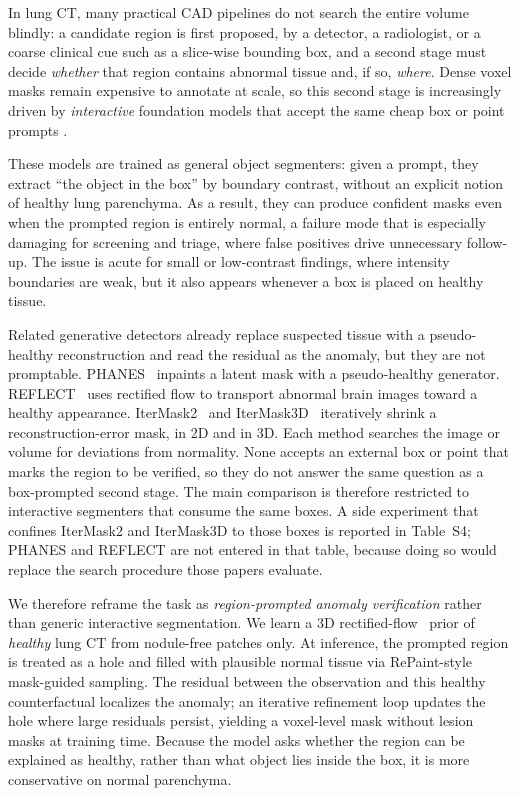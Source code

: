 \documentclass[twoside]{article}
\newcommand{\suppTabUnprompted}{Table~S4}
\begin{document}
In lung CT, many practical CAD pipelines do not search the entire
volume blindly: a candidate region is first proposed, by a
detector, a radiologist, or a coarse clinical cue such as a
slice-wise bounding box, and a second stage must decide
\emph{whether} that region contains abnormal tissue and, if so,
\emph{where}. Dense voxel masks remain expensive to annotate at
scale, so this second stage is increasingly driven by
\emph{interactive} foundation models that accept the same cheap
box or point prompts
\citep{nninteractive2025,segvol2024,sam_med3d2023,medsam2_2025,vista3d2024}.

These models are trained as general object segmenters: given a prompt,
they extract ``the object in the box'' by boundary contrast, without an
explicit notion of healthy lung parenchyma. As a result, they can produce
confident masks even when the prompted region is entirely
normal, a failure mode that is especially damaging for screening and
triage, where false positives drive unnecessary follow-up. The issue is
acute for small or low-contrast findings, where intensity boundaries are
weak, but it also appears whenever a box is placed on healthy tissue.

Related generative detectors already replace suspected tissue with a
pseudo-healthy reconstruction and read the residual as the anomaly, but
they are not promptable.
PHANES~\citep{phanes2023} inpaints a latent mask with a pseudo-healthy
generator.
REFLECT~\citep{reflect2025} uses rectified flow to transport abnormal
brain images toward a healthy appearance.
IterMask2~\citep{itermask2024} and IterMask3D~\citep{itermask3d2025}
iteratively shrink a reconstruction-error mask, in 2D and in 3D.
Each method searches the image or volume for deviations from normality.
None accepts an external box or point that marks the region to be
verified, so they do not answer the same question as a box-prompted
second stage.
The main comparison is therefore restricted to interactive segmenters
that consume the same boxes.
A side experiment that confines IterMask2 and IterMask3D to those boxes
is reported in \suppTabUnprompted{}; PHANES and REFLECT are not entered
in that table, because doing so would replace the search procedure those
papers evaluate.

We therefore reframe the task as \emph{region-prompted anomaly
verification} rather than generic interactive segmentation. We learn a
3D rectified-flow~\citep{liu2023flow} prior of \emph{healthy} lung CT from nodule-free
patches only. At inference, the prompted region is treated as a hole
and filled with plausible normal tissue via RePaint-style~\citep{lugmayr2022repaint}
mask-guided sampling. The residual between the observation and this
healthy counterfactual localizes the anomaly; an iterative refinement
loop updates the hole where large residuals persist, yielding a
voxel-level mask without lesion masks at training time. Because the model
asks whether the region can be explained as healthy, rather than what
object lies inside the box, it is more conservative on normal parenchyma.
\end{document}
